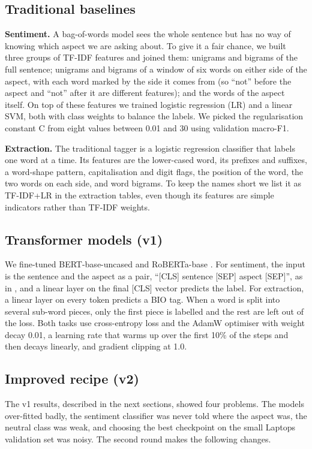 \documentclass[11pt]{article}
\begin{document}
\subsection{Traditional baselines}
\textbf{Sentiment.} A bag-of-words model sees the whole sentence but has no way of knowing which aspect we are asking about. To give it a fair chance, we built three groups of TF-IDF features and joined them: unigrams and bigrams of the full sentence; unigrams and bigrams of a window of six words on either side of the aspect, with each word marked by the side it comes from (so ``not'' before the aspect and ``not'' after it are different features); and the words of the aspect itself. On top of these features we trained logistic regression (LR) and a linear SVM, both with class weights to balance the labels. We picked the regularisation constant C from eight values between 0.01 and 30 using validation macro-F1.

\textbf{Extraction.} The traditional tagger is a logistic regression classifier that labels one word at a time. Its features are the lower-cased word, its prefixes and suffixes, a word-shape pattern, capitalisation and digit flags, the position of the word, the two words on each side, and word bigrams. To keep the names short we list it as TF-IDF+LR in the extraction tables, even though its features are simple indicators rather than TF-IDF weights.

\subsection{Transformer models (v1)}
We fine-tuned BERT-base-uncased \citep{devlin2019bert} and RoBERTa-base \citep{liu2019roberta}. For sentiment, the input is the sentence and the aspect as a pair, ``[CLS] sentence [SEP] aspect [SEP]'', as in \citet{sun2019utilizing}, and a linear layer on the final [CLS] vector predicts the label. For extraction, a linear layer on every token predicts a BIO tag. When a word is split into several sub-word pieces, only the first piece is labelled and the rest are left out of the loss. Both tasks use cross-entropy loss and the AdamW optimiser with weight decay 0.01, a learning rate that warms up over the first 10\% of the steps and then decays linearly, and gradient clipping at 1.0.

\subsection{Improved recipe (v2)}
The v1 results, described in the next sections, showed four problems. The models over-fitted badly, the sentiment classifier was never told where the aspect was, the neutral class was weak, and choosing the best checkpoint on the small Laptops validation set was noisy. The second round makes the following changes.
\end{document}
